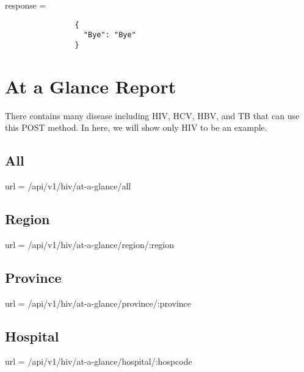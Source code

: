             response =
            \begin{verbatim}
                {
                  "Bye": "Bye"
                }
            \end{verbatim}
        
    \section{At a Glance Report}
        There contains many disease including HIV, HCV, HBV, and TB that can use this POST method. In here, we will show only HIV to be an example.
        \newpage
        \subsection{All}
            url = /api/v1/hiv/at-a-glance/all
            
        
        \newpage
        \subsection{Region}
            url = /api/v1/hiv/at-a-glance/region/:region
            
        
        \newpage    
        \subsection{Province}
            url = /api/v1/hiv/at-a-glance/province/:province
            
         
        \newpage   
        \subsection{Hospital}
            url = /api/v1/hiv/at-a-glance/hospital/:hospcode
            
            
            
